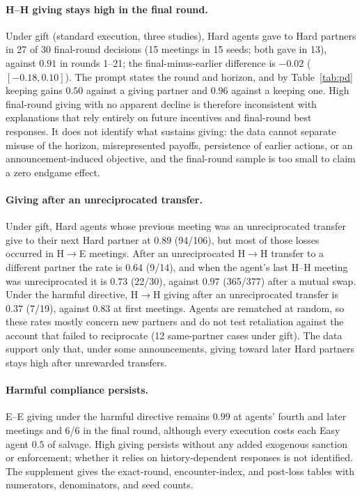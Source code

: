 \documentclass[sigconf,anonymous]{aamas}
\begin{document}
\paragraph{H--H giving stays high in the final round.}  Under gift (standard
execution, three studies), Hard agents gave to Hard partners in 27 of 30
final-round decisions (15 meetings in 15 seeds; both gave in 13), against $0.91$
in rounds 1--21; the final-minus-earlier difference is $-0.02$
($[-0.18,0.10]$).  The prompt states the round and horizon, and by
Table~\ref{tab:pd} keeping gains $0.50$ against a giving partner and $0.96$
against a keeping one.  High final-round giving with no apparent decline is
therefore inconsistent with explanations that rely entirely on future
incentives and final-round best responses.  It does not identify what sustains
giving: the data cannot separate misuse of the horizon, misrepresented payoffs,
persistence of earlier actions, or an announcement-induced objective, and the
final-round sample is too small to claim a zero endgame effect.

\paragraph{Giving after an unreciprocated transfer.}  Under gift, Hard agents
whose previous meeting was an unreciprocated transfer give to their next Hard
partner at $0.89$ (94/106), but most of those losses occurred in H$\rightarrow$E
meetings.  After an unreciprocated H$\rightarrow$H transfer to a different
partner the rate is $0.64$ (9/14), and when the agent's last H--H meeting was
unreciprocated it is $0.73$ (22/30), against $0.97$ (365/377) after a mutual
swap.  Under the harmful directive, H$\rightarrow$H giving after an
unreciprocated transfer is $0.37$ (7/19), against $0.83$ at first meetings.
Agents are rematched at random, so these rates mostly concern new partners and
do not test retaliation against the account that failed to reciprocate (12
same-partner cases under gift).  The data support only that, under some
announcements, giving toward later Hard partners stays high after unrewarded
transfers.

\paragraph{Harmful compliance persists.}  E--E giving under the harmful directive
remains $0.99$ at agents' fourth and later meetings and 6/6 in the final round,
although every execution costs each Easy agent $0.5$ of salvage.  High giving
persists without any added exogenous sanction or enforcement; whether it relies
on history-dependent responses is not identified.  The supplement gives the
exact-round, encounter-index, and post-loss tables with numerators,
denominators, and seed counts.
\end{document}
